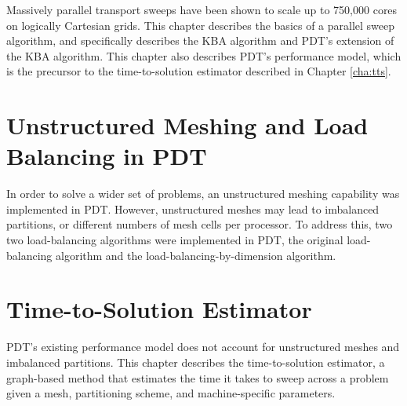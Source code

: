 Massively parallel transport sweeps have been shown to scale up to 750,000 cores on logically Cartesian grids.
This chapter describes the basics of a parallel sweep algorithm, and specifically describes the KBA algorithm and PDT's extension of the KBA algorithm.
This chapter also describes PDT's performance model, which is the precursor to the time-to-solution estimator described in Chapter \ref{cha:tts}.
\\

\section*{Unstructured Meshing and Load Balancing in PDT}

In order to solve a wider set of problems, an unstructured meshing capability was implemented in PDT.
However, unstructured meshes may lead to imbalanced partitions, or different numbers of mesh cells per processor.
To address this, two two load-balancing algorithms were implemented in PDT, the original load-balancing algorithm and the load-balancing-by-dimension algorithm.

\section*{Time-to-Solution Estimator}

PDT's existing performance model does not account for unstructured meshes and imbalanced partitions.
This chapter describes the time-to-solution estimator, a graph-based method that estimates the time it takes to sweep across a problem given a mesh, partitioning scheme, and machine-specific parameters.

